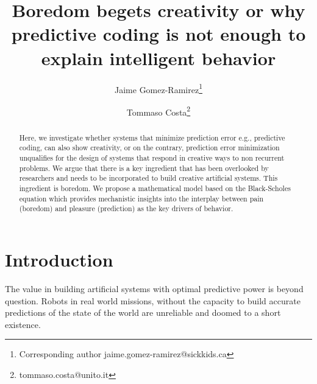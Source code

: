 \documentclass[11pt, onecolumn]{article}
\begin{document}
\title{Boredom begets creativity or why predictive coding is not enough to explain intelligent behavior}

\author[1]{Jaime Gomez-Ramirez\thanks{Corresponding author \hspace{0.6cm} jaime.gomez-ramirez@sickkids.ca}}
\author[2]{Tommaso Costa\thanks{\hspace{0.6cm} tommaso.costa@unito.it}}

\date{}
\maketitle

\begin{abstract}
Here, we investigate whether systems that minimize prediction error e.g., predictive coding, can also show creativity, or on the contrary, prediction error minimization unqualifies for the design of systems that respond in creative ways to non recurrent problems. 
We argue that there is a key ingredient that has been overlooked by researchers and needs to be incorporated to build creative artificial systems. This ingredient is boredom. We propose a mathematical model based on the Black-Scholes equation which provides mechanistic insights into the interplay between pain (boredom) and pleasure (prediction) as the key drivers of behavior.
\end{abstract}
\section{Introduction}
The value in building artificial systems with optimal predictive power is beyond question. Robots in real world missions, without the capacity to build accurate predictions of the state of the world are unreliable and doomed to a short existence. 
\end{document}
